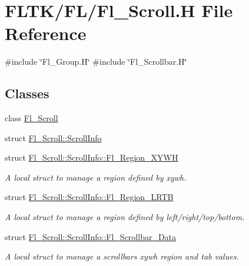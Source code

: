 \hypertarget{_fl___scroll_8_h}{}\section{F\+L\+T\+K/\+F\+L/\+Fl\+\_\+\+Scroll.H File Reference}
\label{_fl___scroll_8_h}
{\ttfamily \#include \char`\"{}Fl\+\_\+\+Group.\+H\char`\"{}}\newline
{\ttfamily \#include \char`\"{}Fl\+\_\+\+Scrollbar.\+H\char`\"{}}\newline
\subsection*{Classes}
\begin{DoxyCompactItemize}
\item 
class \hyperlink{class_fl___scroll}{Fl\+\_\+\+Scroll}
\item 
struct \hyperlink{struct_fl___scroll_1_1_scroll_info}{Fl\+\_\+\+Scroll\+::\+Scroll\+Info}
\item 
struct \hyperlink{struct_fl___scroll_1_1_scroll_info_1_1_fl___region___x_y_w_h}{Fl\+\_\+\+Scroll\+::\+Scroll\+Info\+::\+Fl\+\_\+\+Region\+\_\+\+X\+Y\+WH}
\begin{DoxyCompactList}\small\item\em A local struct to manage a region defined by xywh. \end{DoxyCompactList}\item 
struct \hyperlink{struct_fl___scroll_1_1_scroll_info_1_1_fl___region___l_r_t_b}{Fl\+\_\+\+Scroll\+::\+Scroll\+Info\+::\+Fl\+\_\+\+Region\+\_\+\+L\+R\+TB}
\begin{DoxyCompactList}\small\item\em A local struct to manage a region defined by left/right/top/bottom. \end{DoxyCompactList}\item 
struct \hyperlink{struct_fl___scroll_1_1_scroll_info_1_1_fl___scrollbar___data}{Fl\+\_\+\+Scroll\+::\+Scroll\+Info\+::\+Fl\+\_\+\+Scrollbar\+\_\+\+Data}
\begin{DoxyCompactList}\small\item\em A local struct to manage a scrollbar\textquotesingle{}s xywh region and tab values. \end{DoxyCompactList}\end{DoxyCompactItemize}
